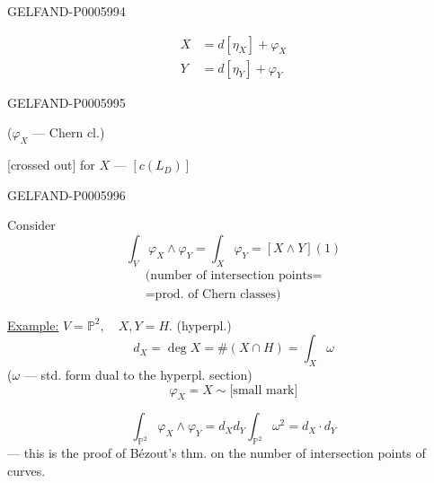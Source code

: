 \begin{GelfandAdjacentEvidence}{GELFAND-P000599}{4}

\[
\begin{aligned}
X&=d[\eta_X]+\varphi_X\\
Y&=d[\eta_Y]+\varphi_Y
\end{aligned}
\]
\end{GelfandAdjacentEvidence}
\begin{GelfandAdjacentEvidence}{GELFAND-P000599}{5}

\hfill(\(\varphi_X\) — Chern cl.)\par
\hfill [crossed out] for \(X\) — \([c(L_D)]\)\par
{}
\end{GelfandAdjacentEvidence}
\begin{GelfandAdjacentEvidence}{GELFAND-P000599}{6}


Consider
\[
\int_V\varphi_X\wedge\varphi_Y=\int_X\varphi_Y=[X\wedge Y](1)
\]
\begin{gather*}
\text{(number of intersection points}={}\\[-.16em]
{}=\text{prod. of Chern classes)}
\end{gather*}

\underline{Example:} \(V=\mathbb P^2,\quad X,Y=H\). (hyperpl.)
\[
d_X=\operatorname{deg}X=\#(X\cap H)=\int_X\omega
\]
(\(\omega\) — std. form dual to the hyperpl. section)
\[
\varphi_X=X\sim\text{[small mark]}
\]
\end{GelfandAdjacentEvidence}

\[
\int_{\mathbb P^2}\varphi_X\wedge\varphi_Y=d_Xd_Y\int_{\mathbb P^2}\omega^2=d_X\cdot d_Y
\]
— this is the proof of Bézout’s thm. on the number of intersection points of curves.


